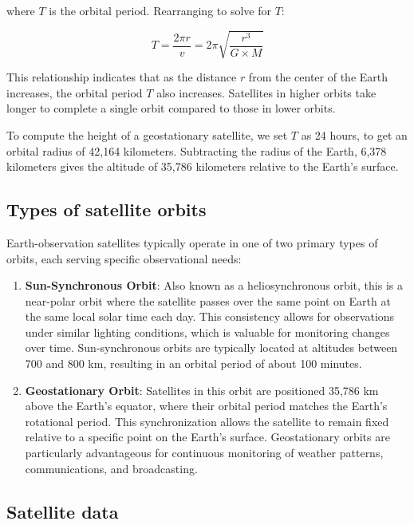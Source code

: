 \documentclass[
  12 pt,
]{Nemilov}
\begin{document}
where \(T\) is the orbital period. Rearranging to solve for \(T\):

\[
T = \frac{2 \pi r}{v} = 2 \pi \sqrt{\frac{r^3}{G \times M}}
\]

This relationship indicates that as the distance \(r\) from the center of the Earth increases, the orbital period \(T\) also increases. Satellites in higher orbits take longer to complete a single orbit compared to those in lower orbits.

To compute the height of a geostationary satellite, we set \(T\) as 24 hours, to get an orbital radius of 42,164 kilometers. Subtracting the radius of the Earth, 6,378 kilometers gives the altitude of 35,786 kilometers relative to the Earth's surface.

\subsection{Types of satellite orbits}\label{types-of-satellite-orbits}

Earth-observation satellites typically operate in one of two primary types of orbits, each serving specific observational needs:

\begin{enumerate}
\def\labelenumi{\arabic{enumi}.}
\item
  \textbf{Sun-Synchronous Orbit}: Also known as a heliosynchronous orbit, this is a near-polar orbit where the satellite passes over the same point on Earth at the same local solar time each day. This consistency allows for observations under similar lighting conditions, which is valuable for monitoring changes over time. Sun-synchronous orbits are typically located at altitudes between 700 and 800 km, resulting in an orbital period of about 100 minutes.
\item
  \textbf{Geostationary Orbit}: Satellites in this orbit are positioned 35,786 km above the Earth's equator, where their orbital period matches the Earth's rotational period. This synchronization allows the satellite to remain fixed relative to a specific point on the Earth's surface. Geostationary orbits are particularly advantageous for continuous monitoring of weather patterns, communications, and broadcasting.
\end{enumerate}

\subsection{Satellite data}\label{sat-data}
\end{document}
